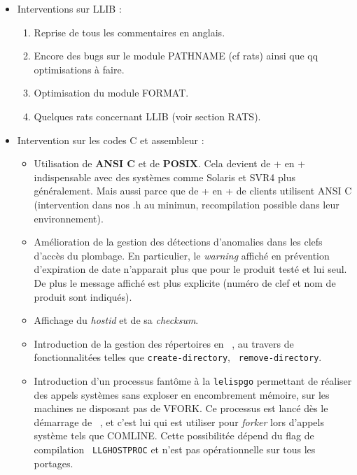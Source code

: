 \begin {itemize}

\item Interventions sur LLIB :\\
\begin{enumerate}
\item
Reprise de tous les commentaires en anglais.

\item
Encore des bugs sur le module PATHNAME (cf rats) ainsi que qq
optimisations \`{a} faire.

\item 
Optimisation du module FORMAT.

\item
Quelques rats concernant LLIB (voir section RATS).
\end{enumerate}

\item Intervention sur les codes C et assembleur :\\

\begin {itemize}

\item
Utilisation de {\bf ANSI C}  et de {\bf POSIX}.
Cela devient de + en + indispensable avec des syst\`{e}mes comme Solaris
et SVR4 plus g\'{e}n\'{e}ralement. Mais aussi parce que de + en + de clients
utilisent ANSI C (intervention dans nos .h au minimun, recompilation
possible dans leur environnement).

\item
Am\'{e}lioration de la gestion des d\'{e}tections d'anomalies dans les clefs
d'acc\`{e}s du plombage. En particulier, le {\it warning} affich\'{e} en pr\'{e}vention
d'expiration de date n'apparait plus que pour le produit test\'{e} et lui
seul. De plus le message affich\'{e} est plus explicite (num\'{e}ro de clef
et nom de produit sont indiqu\'{e}s).

\item
Affichage du {\it hostid} et de sa {\it checksum}.

\item 
Introduction de la gestion des r\'{e}pertoires en \LeLisp\ , au travers
de fonctionnalit\'{e}es telles que {\tt create-directory}, {\tt
remove-directory}.

\item 
Introduction d'un processus fant\^{o}me \`{a} la {\tt lelispgo} permettant
de r\'{e}aliser des appels syst\`{e}mes sans exploser en encombrement
m\'{e}moire, sur les machines ne disposant pas de VFORK. Ce processus
est lanc\'{e} d\`{e}s le d\'{e}marrage de \LeLisp\ , et c'est lui qui est
utiliser pour {\it forker} lors d'appels syst\`{e}me tels que
COMLINE. Cette possibilit\'{e}e d\'{e}pend du flag de compilation {\tt
LLGHOSTPROC} et n'est pas op\'{e}rationnelle sur tous les portages.


\end{itemize}
\end{itemize}
